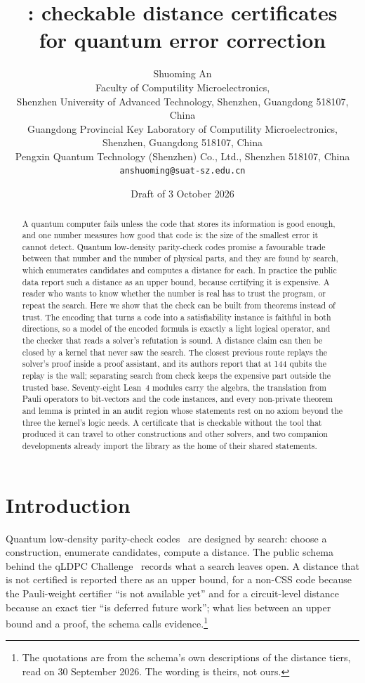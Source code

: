 \documentclass[11pt]{article}
\title{\package{QECCertificates}: checkable distance certificates\\
for quantum error correction}
\author{Shuoming An\\[4pt]
\small Faculty of Computility Microelectronics,\\
\small Shenzhen University of Advanced Technology, Shenzhen, Guangdong 518107,\\
\small China\\[3pt]
\small Guangdong Provincial Key Laboratory of Computility Microelectronics,\\
\small Shenzhen, Guangdong 518107, China\\[3pt]
\small Pengxin Quantum Technology (Shenzhen) Co., Ltd., Shenzhen 518107, China\\[3pt]
\small \texttt{anshuoming@suat-sz.edu.cn}}
\date{Draft of 3 October 2026}
\begin{document}
\maketitle

\begin{abstract}
A quantum computer fails unless the code that stores its information is good enough, and
one number measures how good that code is: the size of the smallest error it cannot
detect. Quantum low-density parity-check codes promise a favourable trade between that
number and the number of physical parts, and they are found by search, which enumerates
candidates and computes a distance for each. In practice the public data report such a
distance as an upper bound, because certifying it is expensive. A reader who wants to know
whether the number is real has to trust the program, or repeat the search. Here we show
that the check can be built from theorems instead of trust. The encoding that turns a code
into a satisfiability instance is faithful in both directions, so a model of the encoded
formula is exactly a light logical operator, and the checker that reads a solver's
refutation is sound. A distance claim can then be closed by a kernel that never saw the
search. The
closest previous route replays the solver's proof inside a proof assistant, and its
authors report that at 144 qubits the replay is the wall; separating search from check
keeps the expensive part outside the trusted base. Seventy-eight Lean~4 modules carry the
algebra, the translation from Pauli operators to bit-vectors and the code instances, and
every non-private theorem and lemma is printed in an audit region whose statements rest on
no axiom beyond the three the kernel's logic needs. A certificate that is checkable without the
tool that produced it can travel to other constructions and other solvers, and two
companion developments already import the library as the home of their shared statements.
\end{abstract}

\section{Introduction}

Quantum low-density parity-check codes~\cite{breuckmann2021} are designed by search:
choose a construction, enumerate candidates, compute a distance. The public schema behind
the qLDPC Challenge~\cite{qldpcchallenge} records what a search leaves open. A distance
that is not certified is reported there as an upper bound, for a non-CSS code because the
Pauli-weight certifier ``is not available yet'' and for a circuit-level distance because
an exact tier ``is deferred future work''; what lies between an upper bound and a proof,
the schema calls evidence.\footnote{The quotations are from the schema's own descriptions of the
distance tiers, read on 30 September 2026. The wording is theirs, not ours.}
\end{document}
